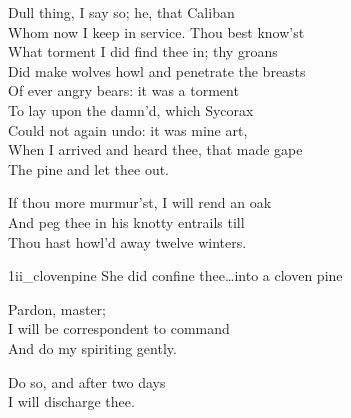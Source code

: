 	
\begin{verse_speech}[Prospero] 
Dull thing, I say so; he, that Caliban\\
Whom now I keep in service. Thou best know'st\\
What torment I did find thee in; thy groans\\
Did make wolves howl and penetrate the breasts\\
Of ever angry bears: it was a torment\\
To lay upon the damn'd, which Sycorax\\
Could not again undo: it was mine art,\\
When I arrived and heard thee, that made gape\\
The pine and let thee out.
\end{verse_speech}

	
\begin{verse_speech}[Prospero] 
If thou more murmur'st, I will rend an oak\\
And peg thee in his knotty entrails till\\
Thou hast howl'd away twelve winters.
\end{verse_speech}



\begin{pictures} %
	\begin{a4}
		\begin{colorbigpic}
			[1]
			{1ii_clovenpine}
			{She did confine thee\dots into a cloven pine}
		\end{colorbigpic}
	\end{a4}
\end{pictures}



\begin{verse_speech}[Ariel] 
Pardon, master;\\
I will be correspondent to command\\
And do my spiriting gently.
\end{verse_speech}

\begin{verse_speech}[Prospero] 
Do so, and after two days\\
I will discharge thee.
\end{verse_speech}

